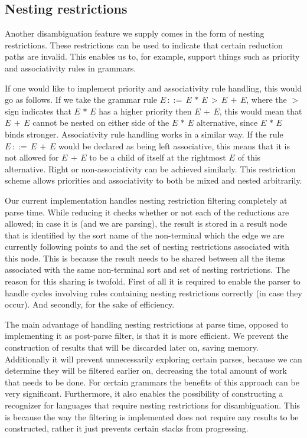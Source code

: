 \documentclass[a4paper,10pt]{article}
\begin{document}
\subsection{Nesting restrictions}

Another disambiguation feature we supply comes in the form of nesting restrictions. These restrictions can be used to indicate that certain reduction paths are invalid. This enables us to, for example, support things such as priority and associativity rules in grammars.

If one would like to implement priority and associativity rule handling, this would go as follows. If we take the grammar rule $E\,::=\,E\,*\,E\,>\,E\,+\,E$, where the $>$ sign indicates that $E\,*\,E$ has a higher priority then $E\,+\,E$, this would mean that $E\,+\,E$ cannot be nested on either side of the $E\,*\,E$ alternative, since $E\,*\,E$ binds stronger. Associativity rule handling works in a similar way. If the rule $E\,::=\,E\,+\,E$ would be declared as being left associative, this means that it is not allowed for $E\,+\,E$ to be a child of itself at the rightmost $E$ of this alternative. Right or non-associativity can be achieved similarly. This restriction scheme allows priorities and associativity to both be mixed and nested arbitrarily.

Our current implementation handles nesting restriction filtering completely at parse time. While reducing it checks whether or not each of the reductions are allowed; in case it is (and we are parsing), the result is stored in a result node that is identified by the sort name of the non-terminal which the edge we are currently following points to and the set of nesting restrictions associated with this node. This is because the result needs to be shared between all the items associated with the same non-terminal sort and set of nesting restrictions. The reason for this sharing is twofold. First of all it is required to enable the parser to handle cycles involving rules containing nesting restrictions correctly (in case they occur). And secondly, for the sake of efficiency.

The main advantage of handling nesting restrictions at parse time, opposed to implementing it as post-parse filter, is that it is more efficient. We prevent the construction of results that will be discarded later on, saving memory. Additionally it will prevent unnecessarily exploring certain parses, because we can determine they will be filtered earlier on, decreasing the total amount of work that needs to be done. For certain grammars the benefits of this approach can be very significant. Furthermore, it also enables the possibility of constructing a recognizer for languages that require nesting restrictions for disambiguation. This is because the way the filtering is implemented does not require any results to be constructed, rather it just prevents certain stacks from progressing.
\end{document}
